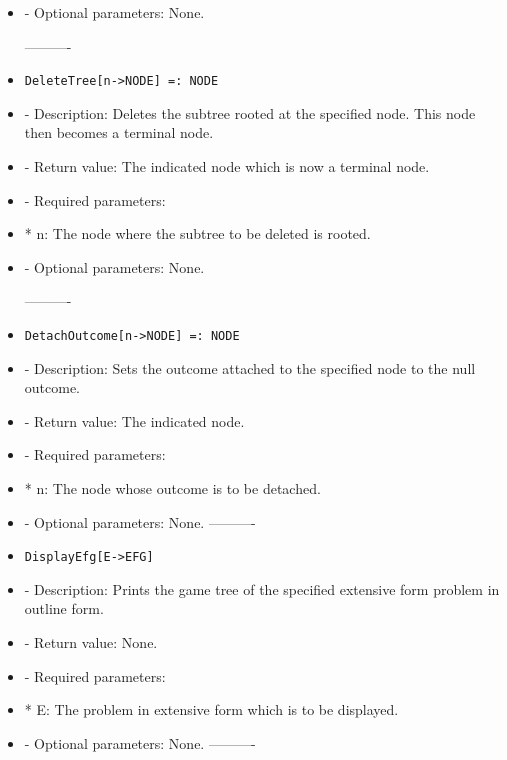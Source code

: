 \begin{itemize}
\item
- Optional parameters:  None.
\ed

----------
\item
\begin{verbatim}
DeleteTree[n->NODE] =: NODE
\end{verbatim}

\bd
\item
- Description:  Deletes the subtree rooted at the specified node.
This node then becomes a terminal node.
\item
- Return value:  The indicated node which is now a terminal node.
\item
- Required parameters:

\bd
\item  
*  n:  The node where the subtree to be deleted is rooted.
\ed

\item
- Optional parameters:  None.
\ed

----------
\item
\begin{verbatim}
DetachOutcome[n->NODE] =: NODE
\end{verbatim}

\bd
\item
- Description:  Sets the outcome attached to the specified node to the 
null outcome.
\item   
- Return value:  The indicated node.
\item
- Required parameters:

\bd
\item	
*  n:  The node whose outcome is to be detached.
\ed

\item
- Optional parameters:  None.
\ed
----------

\item
\begin{verbatim}
DisplayEfg[E->EFG]
\end{verbatim}

\bd
\item
- Description:  Prints the game tree of the specified extensive form
problem in outline form.
\item
- Return value:  None.
\item
- Required parameters:

\bd
\item
*  E:  The problem in extensive form which is to be displayed.
\ed

\item
- Optional parameters:  None.
\ed
----------


\end{itemize}
